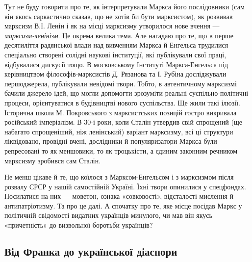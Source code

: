 Тут не буду говорити про те, як інтерпретували Маркса його 
послідовники (сам він якось саркастично сказав, що не хотів би бути 
марксистом), як розвивав марксизм В.І. Ленін і як на місці марксизму 
утворилося нове вчення — \emph{марксизм-ленінізм}. Це окрема велика тема. 
Але нагадаю про те, що в перше десятиліття радянської влади над 
вивченням Маркса й Енгельса трудилися спеціально створені солідні 
наукові інституції, які публікували свої праці, відбувалися дискусії 
тощо. В московському Інституті Маркса-Енгельса під керівництвом 
філософів-марксистів Д. Рязанова та І. Рубіна досліджували 
першоджерела, публікували невідомі твори. Тобто, в автентичному 
марксизмі бачили джерело ідей, що могли допомогти зрозуміти реальні 
суспільно-політичні процеси, орієнтуватися в будівництві нового 
суспільства. Ще жили такі ілюзії. Історична школа М. Покровського з 
марксистських позицій гостро викривала російський імперіалізм. В 30-і 
роки, коли Сталін утвердив свій спрощений (ще набагато спрощеніший, 
ніж ленінський) варіант марксизму, всі ці структури ліквідовано, 
провідні вчені, дослідники й популяризатори Маркса були репресовані 
то як меншовики, то як троцькісти, а єдиним законним речником 
марксизму зробився сам Сталін.


Не менш цікаве й те, що коїлося з Марксом-Енгельсом і з марксизмом 
після розвалу СРСР у нашій самостійній Україні. Їхні твори опинилися у 
спецфондах. Посилатися на них — моветон, ознака «совковості», 
відсталості мислення й антипатріотизму. Та про це далі. А спочатку про 
те, яке місце посідав Маркс у політичній свідомості видатних 
українців минулого, чи мав він якусь «причетність» до визвольної 
боротьби українців?


\subsection*{Від Франка до української діаспори}


